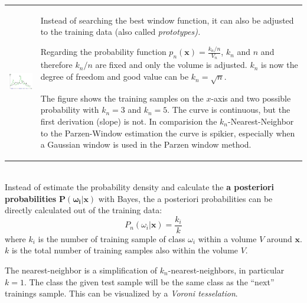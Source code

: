   
    \begin{tabular}{ll}
      \parbox{7cm}{
        \includegraphics[width=6cm]{./images/k-nearest-neighbor.jpg}
          }
        & \parbox{11cm}{
          Instead of searching the best window function, it can also be adjusted to the training data 
          (also called \em prototypes\em).
          
          Regarding the probability function $p_n(\bm{x}) = \frac{k_n/n}{V_n}$, $k_n$ and $n$
          and therefore $k_n/n$ are fixed and only the volume is adjusted. $k_n$ is now the degree 
          of freedom and good value can be $k_n = \sqrt{n}$.
          
          The figure shows the training samples on the $x$-axis and two possible probability
          with $k_n=3$ and $k_n=5$. The curve is continuous, but the first derivation (slope) is not. 
          In comparision the $k_n$-Nearest-Neighbor to the Parzen-Window estimation the curve is spikier, especially when a Gaussian window is used 
          in the Parzen window method.
          }
    \end{tabular} 
    \vspace{3mm}\\
    Instead of estimate the probability density and calculate the \textbf{a posteriori probabilities} $\bm {P(\omega_i | \bm x)}$ with Bayes, the a posteriori 
    probabilities can be directly calculated out of the training data:\\
    $$ P_n(\omega_i|\bm x)=\frac{k_i}{k}$$
    where $k_i$ is the number of training sample of class $\omega_i$ within a volume $V$ around $\bm x$.
    $k$ is the total number of training samples also within the volume $V$.
  
  
  	The nearest-neighbor is a simplification of $k_n$-nearest-neighbors, in particular $k=1$. 
  	The class the given test sample will be the same class as the ``next'' trainings sample.
  	This can be visualized by a \emph{Voroni tesselation}.
  	
